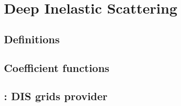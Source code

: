 
\chapter{Deep Inelastic Scattering}
\label{ch:dis}
\minitoc
\adjustmtc



\section{Definitions}
\label{sec/dis:defs}


\section{Coefficient functions}
\label{sec/dis:coeffs}


\section{\yadism: DIS grids provider}
\label{app/dis:yadism}

